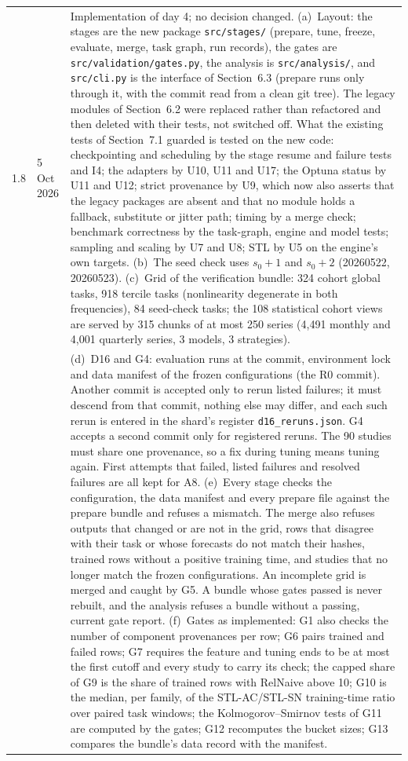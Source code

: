 \documentclass[11pt,a4paper]{article}
\newcommand{\code}[1]{\texttt{#1}}
\begin{document}
\begin{longtable}{@{}p{1.3cm} p{1.9cm} p{11.8cm}@{}}
1.8 & 5 Oct 2026 & Implementation of day 4; no decision changed. (a)~Layout: the stages are the new package \code{src/stages/} (prepare, tune, freeze, evaluate, merge, task graph, run records), the gates are \mbox{\code{src/validation/gates.py}}, the analysis is \code{src/analysis/}, and \code{src/cli.py} is the interface of Section~6.3 (prepare runs only through it, with the commit read from a clean git tree). The legacy modules of Section~6.2 were replaced rather than refactored and then deleted with their tests, not switched off. What the existing tests of Section~7.1 guarded is tested on the new code: checkpointing and scheduling by the stage resume and failure tests and I4; the adapters by U10, U11 and U17; the Optuna status by U11 and U12; strict provenance by U9, which now also asserts that the legacy packages are absent and that no module holds a fallback, substitute or jitter path; timing by a merge check; benchmark correctness by the task-graph, engine and model tests; sampling and scaling by U7 and U8; STL by U5 on the engine's own targets. (b)~The seed check uses $s_0+1$ and $s_0+2$ (20260522, 20260523). (c)~Grid of the verification bundle: 324 cohort global tasks, 918 tercile tasks (nonlinearity degenerate in both frequencies), 84 seed-check tasks; the 108 statistical cohort views are served by 315 chunks of at most 250 series (4,491 monthly and 4,001 quarterly series, 3 models, 3 strategies). \\
 & & (d)~D16 and G4: evaluation runs at the commit, environment lock and data manifest of the frozen configurations (the R0 commit). Another commit is accepted only to rerun listed failures; it must descend from that commit, nothing else may differ, and each such rerun is entered in the shard's register \mbox{\code{d16_reruns.json}}. G4 accepts a second commit only for registered reruns. The 90 studies must share one provenance, so a fix during tuning means tuning again. First attempts that failed, listed failures and resolved failures are all kept for A8. (e)~Every stage checks the configuration, the data manifest and every prepare file against the prepare bundle and refuses a mismatch. The merge also refuses outputs that changed or are not in the grid, rows that disagree with their task or whose forecasts do not match their hashes, trained rows without a positive training time, and studies that no longer match the frozen configurations. An incomplete grid is merged and caught by G5. A bundle whose gates passed is never rebuilt, and the analysis refuses a bundle without a passing, current gate report. (f)~Gates as implemented: G1 also checks the number of component provenances per row; G6 pairs trained and failed rows; G7 requires the feature and tuning ends to be at most the first cutoff and every study to carry its check; the capped share of G9 is the share of trained rows with RelNaive above 10; G10 is the median, per family, of the STL-AC/STL-SN training-time ratio over paired task windows; the Kolmogorov--Smirnov tests of G11 are computed by the gates; G12 recomputes the bucket sizes; G13 compares the bundle's data record with the manifest. \\

\end{longtable}
\end{document}
